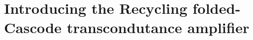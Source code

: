 \section{Introducing the Recycling folded-Cascode transcondutance amplifier}

\textsuperscript{\cite{Lab-statement}}